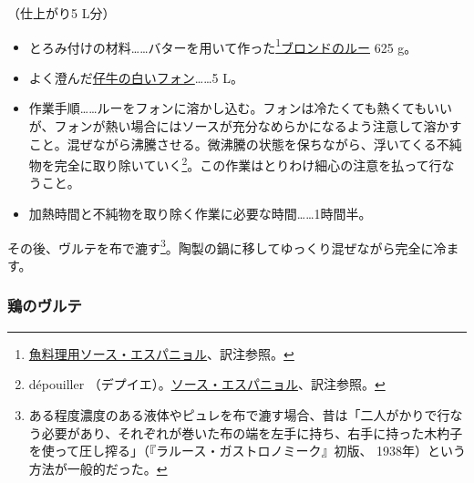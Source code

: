 \begin{recette}

 
 

（仕上がり5 L分）

\begin{itemize}
\item
  とろみ付けの材料\ldots{}\ldots{}バターを用いて作った\footnote{\protect\hyperlink{sauce-espagnole-maigre}{魚料理用ソース・エスパニョル}、訳注参照。}\protect\hyperlink{roux-blond}{ブロンドのルー}
  625 g。
\item
  よく澄んだ\protect\hyperlink{fonds-blanc-ordinaire}{仔牛の白いフォン}\ldots{}\ldots{}5
  L。
\item
  作業手順\ldots{}\ldots{}ルーをフォンに溶かし込む。フォンは冷たくても熱くてもいいが、フォンが熱い場合にはソースが充分なめらかになるよう注意して溶かすこと。混ぜながら沸騰させる。微沸騰の状態を保ちながら、浮いてくる不純物を完全に取り除いていく\footnote{dépouiller
    （デプイエ）。\protect\hyperlink{sauce-espagnole}{ソース・エスパニョル}、訳注参照。}。この作業はとりわけ細心の注意を払って行なうこと。
\item
  加熱時間と不純物を取り除く作業に必要な時間\ldots{}\ldots{}1時間半。
\end{itemize}

その後、ヴルテを布で漉す\footnote{ある程度濃度のある液体やピュレを布で漉す場合、昔は「二人がかりで行なう必要があり、それぞれが巻いた布の端を左手に持ち、右手に持った木杓子を使って圧し搾る」（『ラルース・ガストロノミーク』初版、
  1938年）という方法が一般的だった。}。陶製の鍋に移してゆっくり混ぜながら完全に冷ます。

\atoaki{}

\hypertarget{veloute-de-volaille}{%
\subsubsection{鶏のヴルテ}\label{veloute-de-volaille}}




\end{recette}
